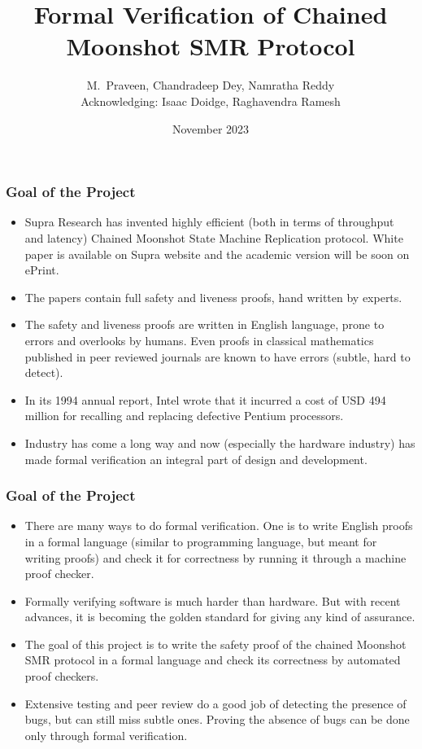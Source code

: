 \documentclass{beamer}
\title{Formal Verification of Chained Moonshot SMR Protocol}
\author{ M.~Praveen, Chandradeep Dey, Namratha Reddy
\\ Acknowledging: Isaac Doidge, Raghavendra Ramesh}
\institute{Chennai Mathematical Institute ~\textbar~ Supra Oracles }
\date{November 2023}
\begin{document}
\begin{frame}
    \titlepage
\end{frame}

\begin{frame}
    \frametitle{Goal of the Project}
    \begin{itemize}
        \item Supra Research has invented highly efficient (both in
            terms of throughput and latency) Chained Moonshot State
            Machine Replication protocol. White paper is available on
            Supra website and the academic version will be soon on
            ePrint.
            \pause
            \vfill
        \item The papers contain full safety and liveness proofs, hand
            written by experts.
            \pause
            \vfill
        \item The safety and liveness proofs are written in English
            language, prone to errors and overlooks by humans. Even
            proofs in classical mathematics published in peer reviewed
            journals are known to have errors (subtle, hard to
            detect).
            \pause
            \vfill
        \item In its 1994 annual report, Intel wrote that it incurred a cost of USD 494 million for recalling and replacing defective Pentium processors.
        \pause
        \vfill
        \item Industry has come a long way and now (especially the hardware industry) has made formal verification an integral part of design and development.
    \end{itemize}
\end{frame}

\begin{frame}
\frametitle{Goal of the Project}
\begin{itemize}
        \item There are many ways to do formal verification. One is to write English proofs in a formal language (similar to programming language, but meant for writing proofs) and check it for correctness by running it through a machine proof checker.
        \pause
        \vfill
        \item Formally verifying software is much harder than hardware. But with recent advances, it is becoming the golden standard for giving any kind of assurance.
        \pause
        \vfill
        \item The goal of this project is to write the safety proof of the chained Moonshot SMR protocol in a formal language and check its correctness by automated proof checkers.
        \pause
        \vfill
        \item Extensive testing and peer review do a good job of detecting the presence of bugs, but can still miss subtle ones. Proving the absence of bugs can be done only through formal verification.
    \end{itemize}
\end{frame}
\end{document}
